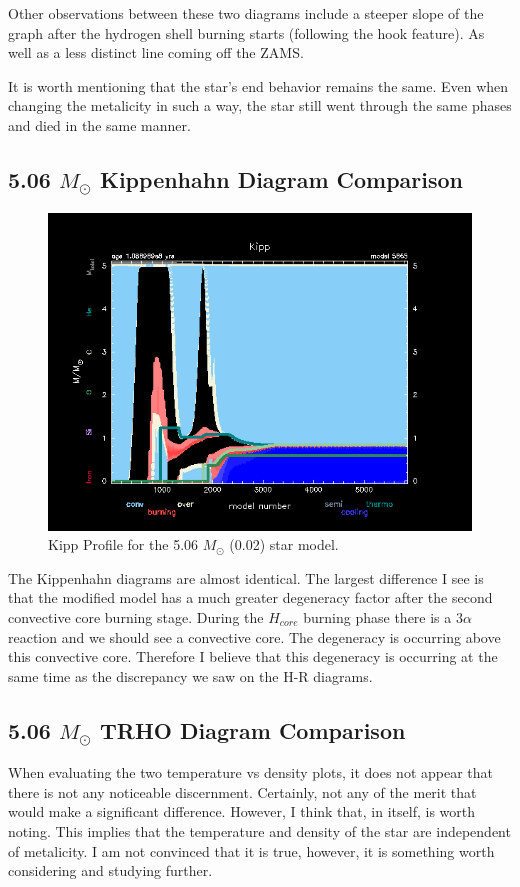 \documentclass[fleqn,usenatbib]{mnras}
\begin{document}
\par Other observations between these two diagrams include a steeper slope of the graph after the hydrogen shell burning starts (following the hook feature).  As well as a less distinct line coming off the ZAMS.
\par It is worth mentioning that the star's end behavior remains the same. Even when changing the metalicity in such a way, the star still went through the same phases and died in the same manner.
\subsection{5.06 \(M_\odot\) Kippenhahn Diagram Comparison}

\begin{figure}
    \centering
    \includegraphics[width=\columnwidth]{kipp_profile05865.png}
    \caption{Kipp Profile for the 5.06 $M_\odot$ (0.02) star model.}
    \label{fig:5.06_Msol_0.02_kipp_figure}
\end{figure}



\par The Kippenhahn diagrams are almost identical.  The largest difference I see is that the modified model has a much greater degeneracy factor after the second convective core burning stage.  During the $H_{core}$ burning phase there is a $3\alpha$ reaction and we should see a convective core. The degeneracy is occurring above this convective core. Therefore I believe that this degeneracy is occurring at the same time as the discrepancy we saw on the H-R diagrams. 
\subsection{5.06 \(M_\odot\) TRHO Diagram Comparison}
\par When evaluating the two temperature vs density plots, it does not appear that there is not any noticeable discernment. Certainly, not any of the merit that would make a significant difference. However, I think that, in itself, is worth noting. This implies that the temperature and density of the star are independent of metalicity. I am not convinced that it is true, however, it is something worth considering and studying further.
\end{document}
